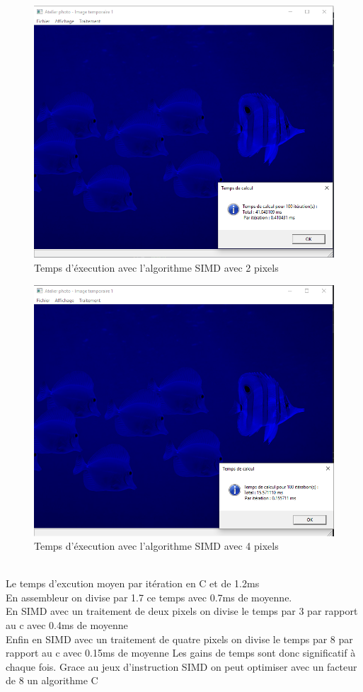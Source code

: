 \documentclass[11pt]{report}
\begin{document}
\begin{figure}[h]
\includegraphics[width=13cm]{CaptureSimd2.png}
\caption{Temps d'éxecution avec l'algorithme SIMD avec 2 pixels}
\end{figure}

\begin{figure}[h]
\includegraphics[width=13cm]{CaptureSimd4.png}
\caption{Temps d'éxecution avec l'algorithme SIMD avec 4 pixels}
\end{figure}

\\Le temps d'excution moyen par itération en C et de 1.2ms
\\En assembleur on divise par 1.7 ce temps avec 0.7ms de moyenne.
\\En SIMD avec un traitement de deux pixels on divise le temps par 3 par rapport au c avec 0.4ms de moyenne
\\Enfin en SIMD avec un traitement de quatre pixels on divise le temps par 8 par rapport au c avec 0.15ms de moyenne
Les gains de temps sont donc significatif à chaque fois. Grace au jeux d'instruction SIMD on peut optimiser avec un facteur de 8 un algorithme C
\end{document}
